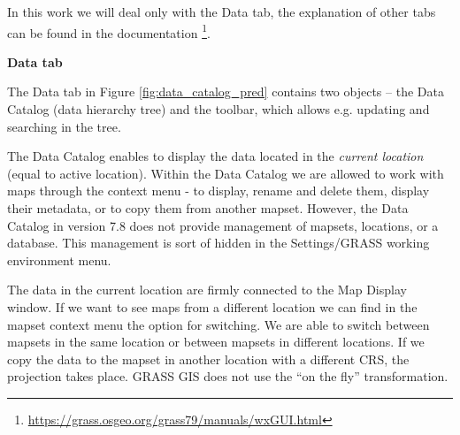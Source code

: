 \documentclass[a4paper,10pt,twoside]{article}
\begin{document}
\noindent In this work we will deal only with the Data tab, the
explanation of other tabs can be found in the documentation
\footnote{\url{https://grass.osgeo.org/grass79/manuals/wxGUI.html}}.
 
\bigskip
\noindent \textbf {Data tab}

\noindent The Data tab  in Figure \ref{fig:data_catalog_pred} contains 
two objects -- the Data Catalog (data hierarchy tree)
and the toolbar, which allows e.g. updating and searching in the tree.

The Data Catalog enables to display the data located in the 
\textit{current location} (equal to active location). Within the 
Data Catalog we are allowed to work with maps through
the context menu - to display, rename and delete them, display their
metadata, or to copy them from another mapset. However, the Data Catalog
in version 7.8 does not provide management of mapsets, locations, or a
database. This management is sort of hidden in the Settings/GRASS
working environment menu.

The data in the current location are firmly connected to the Map Display
window. If we want to see maps from a different location we can find in
the mapset context menu the option for switching. We are able to
switch between mapsets in the same location or between mapsets in
different locations. If we copy the data to the mapset in another
location with a different CRS, the projection takes place. GRASS GIS
does not use the ``on the fly'' transformation.

\end{document}

